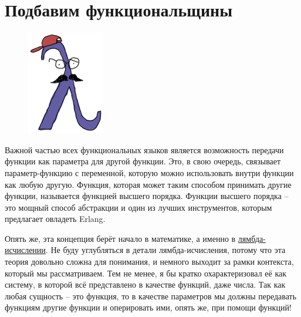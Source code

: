 \documentclass[a4paper,12pt]{report}
\begin{document}
\section{Подбавим функциональщины}
\label{higher_order_functions}
\begin{figure}
    \includegraphics[width=1\linewidth]{lambda.png}
\end{figure}
Важной частью всех функциональных языков является возможность передачи функции как параметра для другой функции. Это, в свою очередь, связывает параметр\--функцию с переменной, которую можно использовать внутри функции как любую другую. Функция, которая может таким способом принимать другие функции, называется функцией высшего порядка. Функции высшего порядка \--- это мощный способ абстракции и один из лучших инструментов, которым предлагает овладеть Erlang.

Опять же, эта концепция берёт начало в математике, а именно в \href{http://en.wikipedia.org/wiki/Lambda\_calculus}{лямбда\--исчислении}. Не буду углубляться в детали лямбда\--исчисления, потому что эта теория довольно сложна для понимания, и немного выходит за рамки контекста, который мы рассматриваем. Тем не менее, я бы кратко охарактеризовал её как систему, в которой всё представлено в качестве функций, даже числа. Так как любая сущность \--- это функция, то в качестве параметров мы должны передавать функциям другие функции и оперировать ими, опять же, при помощи функций!
\end{document}
